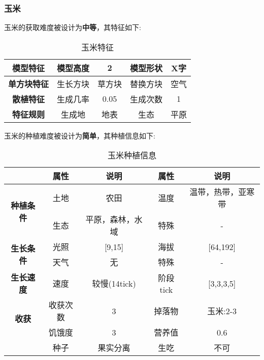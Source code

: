 \subsubsection{玉米}

玉米的获取难度被设计为\textbf{中等}，其特征如下:
\begin{table}[H]
    \centering
    \caption{玉米特征}
    \label{table:玉米特征}
    \setlength{\tabcolsep}{4mm}
    \begin{tabular}{c|cc|cc}
        \toprule
        \textbf{模型特征}   & 模型高度 & 2      & 模型形状 & X字 \\
        \midrule
        \textbf{单方块特征} & 生长方块 & 草方块 & 替换方块 & 空气 \\
        \midrule
        \textbf{散植特征}   & 生成几率 & 0.05   & 生成次数 & 1    \\
        \midrule
        \textbf{特征规则}   & 生成地   & 地表   & 生态     & 平原 \\
        \bottomrule
    \end{tabular}
\end{table}


玉米的种植难度被设计为\textbf{简单}，其种植信息如下:

\begin{table}[H]
    \centering
    \caption{玉米种植信息}
    \label{table:玉米种植信息}
    \setlength{\tabcolsep}{4mm}
    \begin{tabular}{c|cc|cc}
        \toprule
                                           & \textbf{属性} & \textbf{说明}    & \textbf{属性} & \textbf{说明}      \\
        \midrule
        \multirow{2}{*}{\textbf{种植条件}} & 土地          & 农田      & 温度          & 温带，热带，亚寒带 \\
                                           & 生态          & 平原，森林，水域 & 特殊          & -                  \\
        \midrule
        \multirow{2}{*}{\textbf{生长条件}} & 光照          & [9,15]           & 海拔          & [64,192]           \\
                                           & 天气          & 无               & 特殊          & -                  \\
        \midrule
        \textbf{生长速度}                  & 速度          & 较慢(14tick)     & 阶段tick      & [3,3,3,5]          \\
        \midrule
        \multirow{2}{*}{\textbf{收获}}     & 收获次数      & 3                & 掉落物        & 玉米:2-3           \\
                                           & 饥饿度        & 3                & 营养值        & 0.6                \\
                                           & 种子 & 果实分离 & 生吃 & 不可 \\
        \bottomrule
    \end{tabular}
\end{table}

